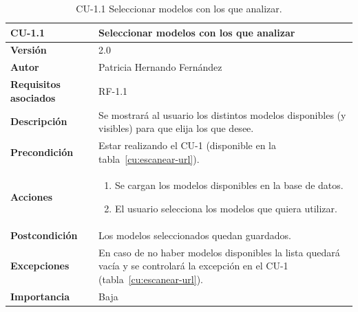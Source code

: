 \begin{table}[p]
	\centering
	\begin{tabularx}{\linewidth}{ p{} p{} }
		\toprule
		\textbf{CU-1.1}    & \textbf{Seleccionar modelos con los que analizar}\\
		\toprule
		\textbf{Versión}              & 2.0    \\
		\textbf{Autor}                & Patricia Hernando Fernández \\
		\textbf{Requisitos asociados} & RF-1.1 \\
		\textbf{Descripción}          & Se mostrará al usuario los distintos modelos disponibles (y visibles) para que elija los que desee. \\
		\textbf{Precondición}         & Estar realizando el CU-1 (disponible en la tabla~\ref{cu:escanear-url}). \\
		\textbf{Acciones}             &
		\begin{enumerate}
			\def\labelenumi{\arabic{enumi}.}
			\tightlist
			\item Se cargan los modelos disponibles en la base de datos.
			\item El usuario selecciona los modelos que quiera utilizar.
		\end{enumerate}\\
		\textbf{Postcondición}        & Los modelos seleccionados quedan guardados. \\
		\textbf{Excepciones}          & En caso de no haber modelos disponibles la lista quedará vacía y se controlará la excepción en el CU-1 (tabla~\ref{cu:escanear-url}). \\
		\textbf{Importancia}          & Baja \\
		\bottomrule
	\end{tabularx}
	\caption{CU-1.1 Seleccionar modelos con los que analizar.}
	\label{cu:seleccionar-modelos-ml}
\end{table}



